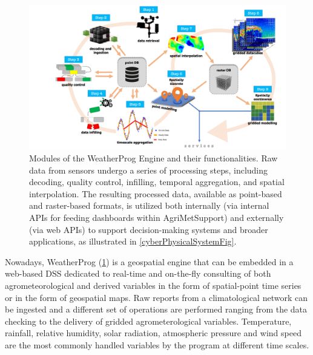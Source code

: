 \documentclass[authoryear,preprint,review,12pt]{elsarticle}
\begin{document}
\begin{figure}[!t] %
	\centering %
	\includegraphics[angle=0,scale=.45,trim=3cm 0cm 0cm 0cm,clip]{figures/Fig03_WeatherProg_modules.png}
	\caption{
            Modules of the WeatherProg Engine and their functionalities. Raw data from sensors undergo a series of processing steps, including decoding, quality control, infilling, temporal aggregation, and spatial interpolation. The resulting processed data, available as point-based and raster-based formats, is utilized both internally (via internal APIs for feeding dashboards within Agri\-Met\-Support) and externally (via web APIs) to support decision-making systems and broader applications, as illustrated in \cref{cyberPhysicalSystemFig}.
 }
	\label{Fig:WeatherProg}
\end{figure}

Nowadays, WeatherProg (\cref{Fig:WeatherProg}) is a geospatial engine that can be embedded in a web-based DSS dedicated to real-time and on-the-fly consulting of both agrometeorological and derived variables in the form of spatial-point time series or in the form of geospatial maps.
Raw reports from a climatological network can be ingested and a different set of operations are performed ranging from the data checking to the delivery of gridded agrometerological variables.
Temperature, rainfall, relative humidity, solar radiation, atmospheric pressure and wind speed are the most commonly handled variables by the program at different time scales.
\end{document}
